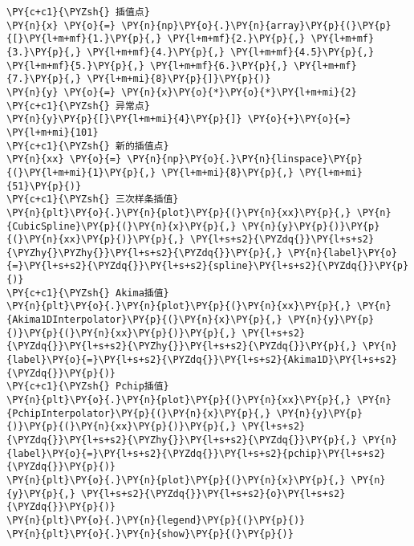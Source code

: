     \begin{tcolorbox}[breakable, size=fbox, boxrule=1pt, pad at break*=1mm,colback=cellbackground, colframe=cellborder]
\begin{Verbatim}[commandchars=\\\{\}]
\PY{c+c1}{\PYZsh{} 插值点}
\PY{n}{x} \PY{o}{=} \PY{n}{np}\PY{o}{.}\PY{n}{array}\PY{p}{(}\PY{p}{[}\PY{l+m+mf}{1.}\PY{p}{,} \PY{l+m+mf}{2.}\PY{p}{,} \PY{l+m+mf}{3.}\PY{p}{,} \PY{l+m+mf}{4.}\PY{p}{,} \PY{l+m+mf}{4.5}\PY{p}{,} \PY{l+m+mf}{5.}\PY{p}{,} \PY{l+m+mf}{6.}\PY{p}{,} \PY{l+m+mf}{7.}\PY{p}{,} \PY{l+m+mi}{8}\PY{p}{]}\PY{p}{)}
\PY{n}{y} \PY{o}{=} \PY{n}{x}\PY{o}{*}\PY{o}{*}\PY{l+m+mi}{2}
\PY{c+c1}{\PYZsh{} 异常点}
\PY{n}{y}\PY{p}{[}\PY{l+m+mi}{4}\PY{p}{]} \PY{o}{+}\PY{o}{=} \PY{l+m+mi}{101}
\PY{c+c1}{\PYZsh{} 新的插值点}
\PY{n}{xx} \PY{o}{=} \PY{n}{np}\PY{o}{.}\PY{n}{linspace}\PY{p}{(}\PY{l+m+mi}{1}\PY{p}{,} \PY{l+m+mi}{8}\PY{p}{,} \PY{l+m+mi}{51}\PY{p}{)}
\PY{c+c1}{\PYZsh{} 三次样条插值}
\PY{n}{plt}\PY{o}{.}\PY{n}{plot}\PY{p}{(}\PY{n}{xx}\PY{p}{,} \PY{n}{CubicSpline}\PY{p}{(}\PY{n}{x}\PY{p}{,} \PY{n}{y}\PY{p}{)}\PY{p}{(}\PY{n}{xx}\PY{p}{)}\PY{p}{,} \PY{l+s+s2}{\PYZdq{}}\PY{l+s+s2}{\PYZhy{}\PYZhy{}}\PY{l+s+s2}{\PYZdq{}}\PY{p}{,} \PY{n}{label}\PY{o}{=}\PY{l+s+s2}{\PYZdq{}}\PY{l+s+s2}{spline}\PY{l+s+s2}{\PYZdq{}}\PY{p}{)}
\PY{c+c1}{\PYZsh{} Akima插值}
\PY{n}{plt}\PY{o}{.}\PY{n}{plot}\PY{p}{(}\PY{n}{xx}\PY{p}{,} \PY{n}{Akima1DInterpolator}\PY{p}{(}\PY{n}{x}\PY{p}{,} \PY{n}{y}\PY{p}{)}\PY{p}{(}\PY{n}{xx}\PY{p}{)}\PY{p}{,} \PY{l+s+s2}{\PYZdq{}}\PY{l+s+s2}{\PYZhy{}}\PY{l+s+s2}{\PYZdq{}}\PY{p}{,} \PY{n}{label}\PY{o}{=}\PY{l+s+s2}{\PYZdq{}}\PY{l+s+s2}{Akima1D}\PY{l+s+s2}{\PYZdq{}}\PY{p}{)}
\PY{c+c1}{\PYZsh{} Pchip插值}
\PY{n}{plt}\PY{o}{.}\PY{n}{plot}\PY{p}{(}\PY{n}{xx}\PY{p}{,} \PY{n}{PchipInterpolator}\PY{p}{(}\PY{n}{x}\PY{p}{,} \PY{n}{y}\PY{p}{)}\PY{p}{(}\PY{n}{xx}\PY{p}{)}\PY{p}{,} \PY{l+s+s2}{\PYZdq{}}\PY{l+s+s2}{\PYZhy{}}\PY{l+s+s2}{\PYZdq{}}\PY{p}{,} \PY{n}{label}\PY{o}{=}\PY{l+s+s2}{\PYZdq{}}\PY{l+s+s2}{pchip}\PY{l+s+s2}{\PYZdq{}}\PY{p}{)}
\PY{n}{plt}\PY{o}{.}\PY{n}{plot}\PY{p}{(}\PY{n}{x}\PY{p}{,} \PY{n}{y}\PY{p}{,} \PY{l+s+s2}{\PYZdq{}}\PY{l+s+s2}{o}\PY{l+s+s2}{\PYZdq{}}\PY{p}{)}
\PY{n}{plt}\PY{o}{.}\PY{n}{legend}\PY{p}{(}\PY{p}{)}
\PY{n}{plt}\PY{o}{.}\PY{n}{show}\PY{p}{(}\PY{p}{)}
\end{Verbatim}
\end{tcolorbox}

    \begin{center}
    \end{center}
    { \hspace*{\fill} \\}